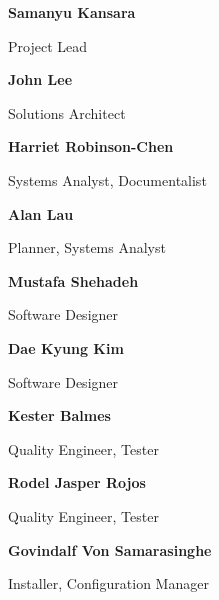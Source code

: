 {\bfseries Samanyu Kansara}\par
 Project Lead\par
\par
 {\bfseries John Lee}\par
 Solutions Architect\par
\par
 {\bfseries Harriet Robinson-\/\-Chen}\par
 Systems Analyst, Documentalist\par
\par
 {\bfseries Alan Lau}\par
 Planner, Systems Analyst\par
\par
 {\bfseries Mustafa Shehadeh}\par
 Software Designer\par
\par
 {\bfseries Dae Kyung Kim}\par
 Software Designer\par
\par
 {\bfseries Kester Balmes}\par
 Quality Engineer, Tester\par
\par
 {\bfseries Rodel Jasper Rojos}\par
 Quality Engineer, Tester\par
\par
 {\bfseries Govindalf Von Samarasinghe}\par
 Installer, Configuration Manager\par
\par
 